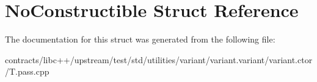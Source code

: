 \hypertarget{struct_no_constructible}{}\section{No\+Constructible Struct Reference}
\label{struct_no_constructible}


The documentation for this struct was generated from the following file\+:\begin{DoxyCompactItemize}
\item 
contracts/libc++/upstream/test/std/utilities/variant/variant.\+variant/variant.\+ctor/T.\+pass.\+cpp\end{DoxyCompactItemize}
